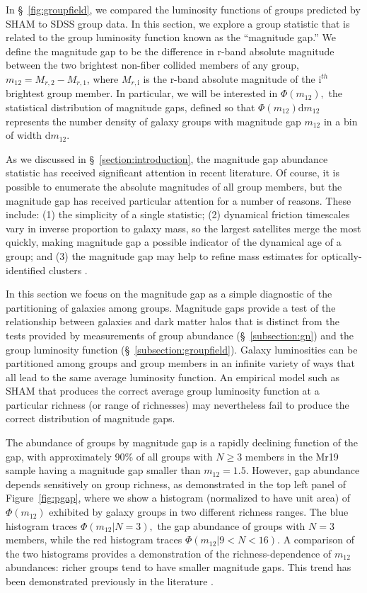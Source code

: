 \documentclass[usenatbib,usegraphicx,letterpaper]{mn2e}
\newcommand{\monetwo}{m_{12}}
\newcommand{\dd}{\mathrm{d}}
\begin{document}
In \S~\ref{fig:groupfield}, we compared the luminosity functions 
of groups predicted by SHAM to SDSS group data.  In this section, we 
explore a group statistic that is related to the group luminosity function 
known as the ``magnitude gap.''  We define the magnitude gap to be 
the difference in r-band absolute magnitude between the two brightest non-fiber collided 
members of any group, $\monetwo = M_{r,2}-M_{r,1}$, where 
$M_{r,\mathrm{i}}$ is the r-band absolute magnitude of the $\mathrm{i}^{th}$ brightest 
group member. In particular, we will be interested in $\Phi(\monetwo),$ the 
statistical distribution of magnitude gaps, defined so that $\Phi(\monetwo)\dd\monetwo$ 
represents the number density of galaxy groups with magnitude gap $\monetwo$ in a bin of width $\dd\monetwo.$


As we discussed in \S~\ref{section:introduction}, the magnitude gap abundance 
statistic has received significant attention in recent literature.  
Of course, it is possible to enumerate the 
absolute magnitudes of all group members, but the magnitude 
gap has received particular attention for a number of reasons.  
These include: 
(1) the simplicity of a single statistic; 
(2) dynamical friction timescales 
vary in inverse proportion to galaxy mass, so the largest satellites 
merge the most quickly, making magnitude gap a possible indicator 
of the dynamical age of a group; 
and (3) the magnitude gap may help 
to refine mass estimates for optically-identified clusters \citep{hearin_etal12,more12}.  


In this section we focus on the magnitude gap as a simple diagnostic of 
the partitioning of galaxies among groups.  Magnitude gaps provide a test of 
the relationship between galaxies and dark matter halos that is distinct from 
the tests provided by measurements of group abundance (\S~\ref{subsection:gn}) 
and the group luminosity function (\S~\ref{subsection:groupfield}). Galaxy luminosities 
can be partitioned among groups and group members in an infinite variety of ways that 
all lead to the same average luminosity function. An empirical model such 
as SHAM that produces the correct average group luminosity function at a particular 
richness (or range of richnesses) may nevertheless fail to produce the correct distribution of magnitude gaps. 


The abundance of groups by magnitude gap is a rapidly declining function of the gap, 
with approximately 90\% of all groups with $N \geq 3$ members in the 
Mr19 sample having a magnitude gap smaller than $\monetwo = 1.5.$ However, gap abundance 
depends sensitively on group richness, as demonstrated in the top left panel of 
Figure~\ref{fig:pgap}, where we show a histogram (normalized to have unit area) 
of $\Phi(\monetwo)$ exhibited by galaxy 
groups in two different richness ranges. 
The blue histogram traces $\Phi(\monetwo|N=3),$ the gap abundance of groups with $N=3$ members, 
while the red histogram traces $\Phi(\monetwo|9<N<16).$ A comparison of the two histograms 
provides a demonstration of the richness-dependence of $\monetwo$ abundances: richer groups 
tend to have smaller magnitude gaps. This trend has been demonstrated previously in the literature 
\cite[e.g.,][]{paranjape_sheth11,donghia_etal05,tavasoli_etal11}. 
\end{document}
